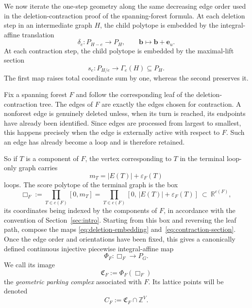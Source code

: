\documentclass[11pt]{article}
\theoremstyle{plain}
\theoremstyle{definition}
\newcommand{\fC}{\mathfrak C}    %
\newcommand{\bb}{\mathbf{b}}
\newcommand{\be}{\mathbf{e}}
\newcommand{\eps}{\varepsilon}
\newcommand{\ZZ}{\mathbb Z}
\newcommand{\RR}{\mathbb R}
\numberwithin{equation}{section}
\begin{document}
We now iterate the one-step geometry along the same decreasing edge order used
in the deletion-contraction proof of the spanning-forest formula.  At each
deletion step in an intermediate graph $H$,
the child polytope is embedded by the integral-affine translation
\begin{equation}
   \delta_e:P_{H-e}\longrightarrow P_H,
   \qquad \bb\longmapsto \bb+\be_u.
\label{eq:deletion-embedding}
\end{equation}
At each contraction step, the child polytope is embedded by the maximal-lift section
\begin{equation}
   s_e:P_{H/e}\longrightarrow\Gamma_e(H)\subseteq P_H.
\label{eq:contraction-section}
\end{equation}
The first map raises total coordinate sum by one, whereas the second preserves it.

Fix a spanning forest $F$ and follow the corresponding leaf of the deletion-contraction tree.
The edges of $F$ are exactly the edges chosen for
contraction.  A nonforest edge is genuinely deleted unless, when its turn is
reached, its endpoints have already been identified.  Since edges are processed
from largest to smallest, this happens precisely when the edge is externally
active with respect to $F$.
Such an edge has already become a loop and is therefore retained.

So if $T$ is a component of $F$, the vertex corresponding to $T$ in
the terminal loop-only graph carries
\begin{equation}
   m_T=|E(T)|+\eps_F(T)
\label{eq:terminal-loop-number}
\end{equation}
loops.  The score polytope of the terminal graph is the box
\begin{equation}
   \Box_F:=
   \prod_{T\in c(F)}[0,m_T]
   =\prod_{T\in c(F)}
      [0,\,|E(T)|+\eps_F(T)]
   \ \subset\ \RR^{c(F)},
\label{eq:terminal-box}
\end{equation}
its coordinates being indexed by the components of $F$, in accordance with the
convention of Section~\ref{sec:intro}.
Starting from this box and reversing the leaf path, compose the maps
\eqref{eq:deletion-embedding} and~\eqref{eq:contraction-section}.  Once the edge
order and orientations have been fixed, this gives a canonically defined
continuous injective piecewise integral-affine map
\begin{equation}
   \Phi_F:\Box_F\longrightarrow P_G.
\label{eq:parking-map}
\end{equation}
We call its image
\[
   \fC_F:=\Phi_F(\Box_F)
\]
the \emph{geometric parking complex} associated with $F$.  Its lattice points
will be denoted
\begin{equation}  \label{eq:cells}
  C_F:=\fC_F\cap\ZZ^V.
\end{equation}
\end{document}
